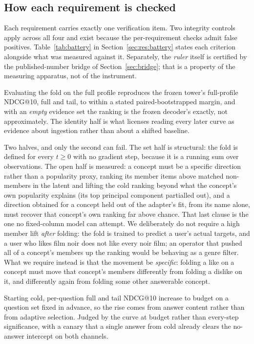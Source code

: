\documentclass[acmsmall,review,anonymous]{acmart}
\begin{document}
\subsection{How each requirement is checked}
Each requirement carries exactly one verification item. Two integrity controls apply across all four and exist because the per-requirement checks admit false positives. Table~\ref{tab:battery} in Section~\ref{sec:res:battery} states each criterion alongside what was measured against it. Separately, the \emph{ruler} itself is certified by the published-number bridge of Section~\ref{sec:bridge}; that is a property of the measuring apparatus, not of the instrument.

\begin{description}[leftmargin=2.4em,itemsep=1.5pt]
  \item[R1, full strength and identity.] Evaluating the fold on the full profile reproduces the frozen tower's full-profile NDCG@10, full and tail, to within a stated paired-bootstrapped margin, and with an \emph{empty} evidence set the ranking is the frozen decoder's exactly, not approximately. The identity half is what licenses reading every later curve as evidence about ingestion rather than about a shifted baseline.
  \item[R2, an open set-valued input interface.] Two halves, and only the second can fail. The set half is structural: the fold is defined for every $t\ge0$ with no gradient step, because it is a running sum over observations. The open half is measured: a concept must be a specific direction rather than a popularity proxy, ranking its member items above matched non-members in the latent and lifting the cold ranking beyond what the concept's own popularity explains (its top principal component partialled out), and a direction obtained for a concept held out of the adapter's fit, from its name alone, must recover that concept's own ranking far above chance. That last clause is the one no fixed-column model can attempt. We deliberately do not require a high member lift \emph{after} folding: the fold is trained to predict a user's actual targets, and a user who likes film noir does not like every noir film; an operator that pushed all of a concept's members up the ranking would be behaving as a genre filter. What we require instead is that the movement be \emph{specific}: folding a like on a concept must move that concept's members differently from folding a dislike on it, and differently again from folding some other answerable concept.
  \item[R3, monotonicity.] Starting cold, per-question full and tail NDCG@10 increase to budget on a question set fixed in advance, so the rise comes from answer content rather than from adaptive selection. Judged by the curve at budget rather than every-step significance, with a canary that a single answer from cold already clears the no-answer intercept on both channels.

\end{description}
\end{document}
